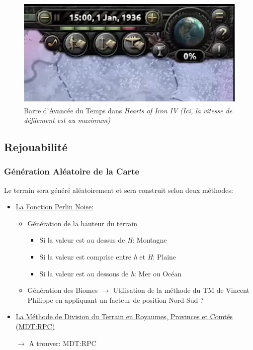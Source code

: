 \documentclass{article}
\newcommand*{\mybox}[2]{\colorbox{#1!30}{\parbox{.98\linewidth}{#2}}}
\newcommand\tab[1][0.5cm]{\hspace*{#1}}
\def\reg{\small{\textsuperscript{\textregistered}}}
\begin{document}
        \begin{figure}[h]
            \centering
                \includegraphics[scale=0.3]{image_hoi4_time.jpeg}
                \caption{Barre d'Avancée du Temps dans \textit{Hearts of Iron IV\reg} \textit{(Ici, la vitesse de défilement est au maximum)}}
                \label{fig:x photosysteme}
        \end{figure}
        
    \subsection{Rejouabilité}
    
    \subsubsection{Génération Aléatoire de la Carte}
        Le terrain sera généré aléatoirement et sera construit selon deux méthodes:
            \begin{itemize}
                \item \underline{ La Fonction Perlin Noise: }
                    \begin{itemize}
                        \item Génération de la hauteur du terrain
                            \begin{itemize}
                                \item Si la valeur est au dessus de \emph{H}: Montagne
                                \item Si la valeur est comprise entre \emph{h} et \emph{H}: Plaine
                                \item Si la valeur est au dessous de \emph{h}: Mer ou Océan
                            \end{itemize}
                        \item Génération des Biomes
                            $\rightarrow$ Utilisation de la méthode du TM de Vincent Philippe en appliquant un facteur de position Nord-Sud ?
                    \end{itemize}
                \item \underline{La Méthode de Division du Terrain en Royaumes, Provinces et Comtés (MDT:RPC)} \\
                
                \tab \mybox{lightgray}{$\rightarrow$ A trouver: MDT:RPC} 
                
            \end{itemize}
            
\end{document}
